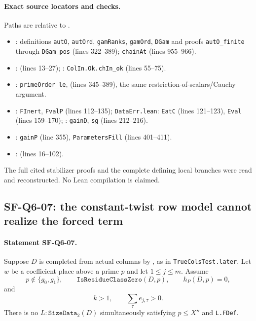 \documentclass[11pt,a4paper]{article}
\theoremstyle{definition}
\theoremstyle{remark}
\begin{document}
\paragraph{Exact source locators and checks.}
Paths are relative to .
\begin{itemize}
\item {}: definitions \texttt{autO}, \texttt{autOrd},
\texttt{gamRanks}, \texttt{gamOrd}, \texttt{DGam} and proofs
\texttt{autO\_finite} through \texttt{DGam\_pos} (lines 322--389);
\texttt{chainAt} (lines 955--966).
\item {}: 
(lines 13--27); :
\texttt{ColIn.Ok.chIn\_ok} (lines 55--75).
\item {}:
\texttt{primeOrder\_le}, 
(lines 345--389), the same restriction-of-scalars/Cauchy argument.
\item {}:
\texttt{FInert}, \texttt{FvalP} (lines 112--135);
\texttt{DataErr.lean}: \texttt{EatC} (lines 121--123),
\texttt{Eval} (lines 159--170); :
\texttt{gainD}, \texttt{sg} (lines 212--216).
\item {}: \texttt{gainP} (line 355),
\texttt{ParametersFill} (lines 401--411).
\item {}:
 (lines 16--102).
\end{itemize}
The full cited stabilizer proofs and the complete defining local
branches were read and reconstructed.  No Lean compilation is claimed.


\subsection{SF-Q6-07: the constant-twist row model cannot realize the forced term}

\paragraph{Statement SF-Q6-07.}
Suppose $D$ is completed from actual columns by
, as in
\texttt{TrueColsTest.later}.  Let $w$ be a coefficient place above
a prime $p$ and let $1\le j\le m$.  Assume
\[
 p\notin\{g_0,g_1\},\qquad
 \texttt{IsResidueClassZero}(D,p),\qquad h_P(D,p)=0,
\]
and
\[
 k>1,\qquad \sum_{\tau}e_{j,\tau}>0.
\]
There is no $L:\texttt{SizeData}_2(D)$ simultaneously satisfying
$p\le X''$ and \texttt{L.FDef}.
\end{document}
